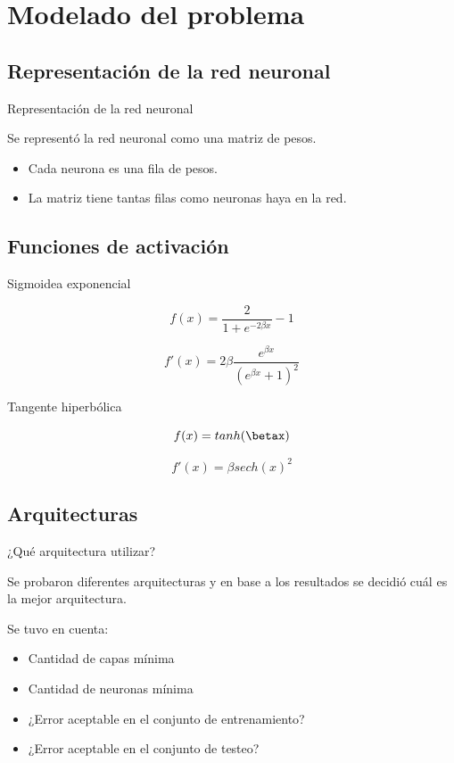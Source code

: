 \documentclass{beamer}
\begin{document}
\section{Modelado del problema}
\subsection{Representación de la red neuronal}

\begin{frame}{Representación de la red neuronal}
\par Se representó la red neuronal como una matriz de pesos. \\
\begin{itemize}
\item Cada neurona es una fila de pesos.
\item La matriz tiene tantas filas como neuronas haya en la red.
\end{itemize}
\end{frame}

\subsection{Funciones de activación}
\begin{frame}
\begin{block}{Sigmoidea exponencial}

\[
  f(x) = \frac{2}{1 + e^{-2 \beta x}}  - 1
\]

\[
  f'(x) = 2 \beta \frac{e^{\beta x}}{(e^{\beta x} + 1)^2}
\]

\end{block}

\begin{block}{Tangente hiperbólica}

\[
  f(x) = tanh(\betax) 
\]


\[
  f'(x) = \beta sech(x)^2 
\]

\end{block}

\end{frame}


\subsection{Arquitecturas}

\begin{frame}{¿Qué arquitectura utilizar?}
\par Se probaron diferentes arquitecturas y en base a los resultados se decidió cuál es la mejor arquitectura.
\par Se tuvo en cuenta:
\begin{itemize}
\item Cantidad de capas mínima
\item Cantidad de neuronas mínima
\item ¿Error aceptable en el conjunto de entrenamiento?
\item ¿Error aceptable en el conjunto de testeo?
\end{itemize}
\end{frame}
\end{document}
